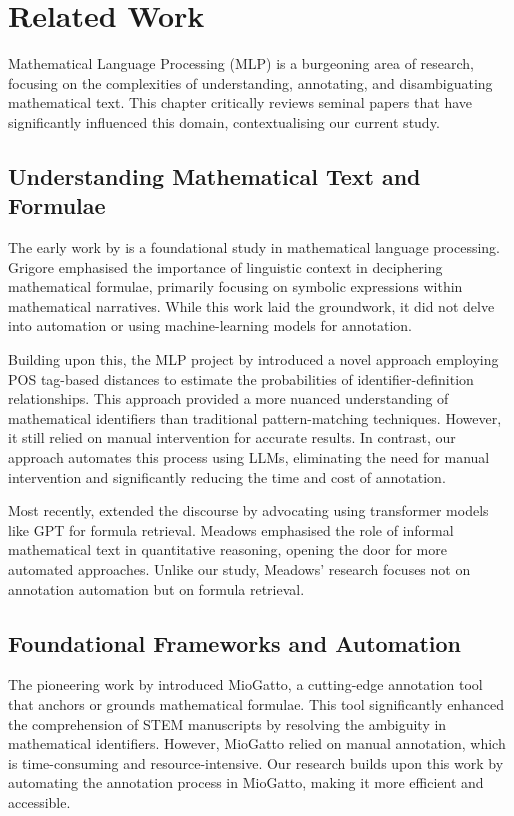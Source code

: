 \chapter{Related Work}\label{chapter:related_work}

Mathematical Language Processing (MLP) is a burgeoning area of research, focusing on the complexities of understanding, annotating, and disambiguating mathematical text. This chapter critically reviews seminal papers that have significantly influenced this domain, contextualising our current study.

\section{Understanding Mathematical Text and Formulae}

The early work by \citet{grigore2009towards} is a foundational study in mathematical language processing. Grigore emphasised the importance of linguistic context in deciphering mathematical formulae, primarily focusing on symbolic expressions within mathematical narratives. While this work laid the groundwork, it did not delve into automation or using machine-learning models for annotation.

Building upon this, the MLP project by \citet{pagael2014mathematical} introduced a novel approach employing \ac{POS} tag-based distances to estimate the probabilities of identifier-definition relationships. This approach provided a more nuanced understanding of mathematical identifiers than traditional pattern-matching techniques. However, it still relied on manual intervention for accurate results. In contrast, our approach automates this process using LLMs, eliminating the need for manual intervention and significantly reducing the time and cost of annotation.

Most recently, \citet{meadows2022survey} extended the discourse by advocating using transformer models like GPT for formula retrieval. Meadows emphasised the role of informal mathematical text in quantitative reasoning, opening the door for more automated approaches. Unlike our study, Meadows' research focuses not on annotation automation but on formula retrieval.

\section{Foundational Frameworks and Automation}

The pioneering work by \citet{asakura2020towards} introduced MioGatto, a cutting-edge annotation tool that anchors or grounds mathematical formulae. This tool significantly enhanced the comprehension of STEM manuscripts by resolving the ambiguity in mathematical identifiers. However, MioGatto relied on manual annotation, which is time-consuming and resource-intensive. Our research builds upon this work by automating the annotation process in MioGatto, making it more efficient and accessible.

